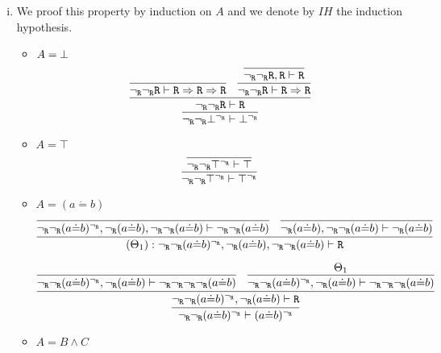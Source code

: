 \begin{enumerate}[(i)]
    \item We proof this property by induction on $A$ and we denote by $IH$ the induction hypothesis.
    \begin{itemize}
        \item $A=\bot$
            $$
                \infer{
                    \ngr\ngr \bottom^\ngr \vdash \bottom^\ngr
                }{
                    \infer{
                        \ngr\ngr \R \vdash \R
                    }{
                        \infer{
                            \ngr\ngr \R \vdash \R\Rightarrow\R\Rightarrow\R
                        }{
                        }&
                        \infer{
                            \ngr\ngr \R \vdash \R\Rightarrow\R
                        }{
                            \infer{
                                \ngr\ngr \R, \R \vdash \R
                            }{
                            }
                        }
                    }
                }
            $$
        \item $A=\top$
            $$
                \infer{
                    \ngr\ngr \top^\ngr \vdash \top^\ngr
                }{
                    \infer{
                        \ngr\ngr \top^\ngr \vdash \top
                    }{
                    }
                }
            $$
        \item $A=(a \dot{=} b)$
            $$
            \infer{
                                (\Theta_1) : \ngr \ngr (a \dot{=} b)^\ngr, \ngr(a \dot{=} b), \ngr \ngr (a \dot{=} b) \vdash \R
                            }{
                                \infer{
                                    \ngr \ngr (a \dot{=} b)^\ngr, \ngr(a \dot{=} b), \ngr \ngr (a \dot{=} b) \vdash \ngr \ngr (a \dot{=} b)
                                }{
                                }&
                                \infer{
                                    \ngr(a \dot{=} b), \ngr \ngr (a \dot{=} b) \vdash \ngr (a \dot{=} b)
                                }{
                                }
                            }
            $$
            
            $$
                \infer{
                    \ngr \ngr (a \dot{=} b)^\ngr \vdash (a \dot{=} b)^\ngr
                }{
                    \infer{
                        \ngr \ngr (a \dot{=} b)^\ngr, \ngr(a \dot{=} b) \vdash \R
                    }{
                        \infer{
                            \ngr \ngr (a \dot{=} b)^\ngr, \ngr(a \dot{=} b) \vdash \ngr \ngr \ngr \ngr (a \dot{=} b)
                        }{
                        }&
                        \infer{
                            \ngr \ngr (a \dot{=} b)^\ngr, \ngr(a \dot{=} b) \vdash \ngr \ngr \ngr (a \dot{=} b)
                        }{
                            \Theta_1
                        }
                    }
                }
            $$
        \item $A=B\wedge C$
        

\end{itemize}
\end{enumerate}
